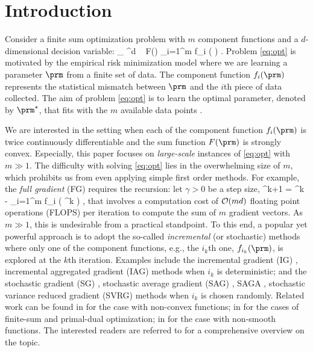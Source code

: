 \documentclass[smallextended]{svjour3}       %
\begin{document}
\section{Introduction}
Consider a finite sum optimization problem
with $m$ component functions and a $d$-dimensional decision variable:
\beq \label{eq:opt}  \textstyle
\min_{ \prm \in \RR^d } ~ F(\prm) \eqdef \sum_{i=1}^m f_i ( \prm ) \eqs.
\eeq
Problem \eqref{eq:opt} is motivated by the empirical risk minimization model 
where we are learning a 
parameter $\prm$ from a finite set of data. 
The component function $f_i(\prm)$ 
represents the statistical mismatch between $\prm$ and the $i$th piece 
of data collected. 
The aim of problem \eqref{eq:opt} is to learn the
optimal parameter, denoted by $\prm^\star$, that fits with the $m$
available data points \cite{vapnik1999overview}. 

We are interested in the setting when each of the component function 
$f_i (\prm)$ is twice continuously differentiable and
the sum function $F(\prm)$ is strongly convex. Especially, this paper focuses on \emph{large-scale} instances of \eqref{eq:opt} with $m \gg 1$.
The difficulty with solving \eqref{eq:opt} lies in the overwhelming size of $m$,
which prohibits us from even applying simple 
first order methods.
For example, 
the \emph{full gradient} ({\sf FG}) %
requires the recursion: let $\gamma > 0$ be a step size,
\beq \label{eq:fg}  \textstyle
\prm^{k+1} = \prm^k - \gamma \sum_{i=1}^m \grd f_i ( \prm^k ) \eqs,
\eeq
that
involves a computation cost of ${\cal O}(md)$ 
floating point operations (FLOPS) per iteration to compute
the sum of $m$ gradient vectors.
As $m \gg 1$, this is   undesirable from a practical standpoint.  
To this end, a popular 
yet powerful approach is to adopt the so-called \emph{incremental} 
(or stochastic) methods
where only one of the component functions, e.g., the $i_k$th one, $f_{i_k}(\prm)$, 
is explored at the $k$th iteration. 
Examples include the incremental gradient ({\sf IG}) \cite{bertsekas2011incremental},
incremental aggregated gradient ({\sf IAG}) \cite{blatt2007convergent,vanli2016stronger,gurbuzbalaban2017convergence} methods when $i_k$ is deterministic; and 
the stochastic gradient ({\sf SG}) \cite{robbins1951stochastic}, stochastic average gradient 
({\sf SAG}) \cite{schmidt2017minimizing}, {\sf SAGA} \cite{defazio2014saga}, stochastic 
variance reduced gradient ({\sf SVRG}) \cite{xiao2014proximal} methods when
$i_k$ is chosen randomly. 
Related work can be found in \cite{mairal2015incremental,so2017non} 
for the case with non-convex functions; 
in \cite{lan2017optimal} for the cases of finite-sum and primal-dual optimization;
in \cite{nedic2001convergence,nedic2001incremental} for the case with non-smooth functions. The interested readers are referred to \cite[Section 4, 5]{bottou2016optimization} for a comprehensive overview on the topic.
\end{document}

